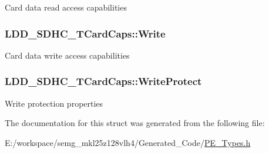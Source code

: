 Card data read access capabilities \hypertarget{struct_l_d_d___s_d_h_c___t_card_caps_ad28c378a6b9edfbd726a8019d5c8be79}{
\subsubsection[{Write}]{ L\-D\-D\-\_\-\-S\-D\-H\-C\-\_\-\-T\-Card\-Caps\-::\-Write}}\label{struct_l_d_d___s_d_h_c___t_card_caps_ad28c378a6b9edfbd726a8019d5c8be79}
Card data write access capabilities \hypertarget{struct_l_d_d___s_d_h_c___t_card_caps_a32ecbbace3b435b1d70a57b09bf9662b}{
\subsubsection[{Write\-Protect}]{ L\-D\-D\-\_\-\-S\-D\-H\-C\-\_\-\-T\-Card\-Caps\-::\-Write\-Protect}}\label{struct_l_d_d___s_d_h_c___t_card_caps_a32ecbbace3b435b1d70a57b09bf9662b}
Write protection properties 

The documentation for this struct was generated from the following file\-:\begin{DoxyCompactItemize}
\item 
E\-:/workspace/semg\-\_\-mkl25z128vlh4/\-Generated\-\_\-\-Code/\hyperlink{_p_e___types_8h}{P\-E\-\_\-\-Types.\-h}\end{DoxyCompactItemize}
